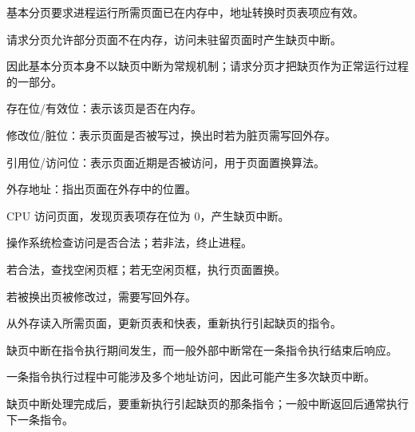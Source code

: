 \begin{points}
  \item 基本分页要求进程运行所需页面已在内存中，地址转换时页表项应有效。
  \item 请求分页允许部分页面不在内存，访问未驻留页面时产生缺页中断。
  \item 因此基本分页本身不以缺页中断为常规机制；请求分页才把缺页作为正常运行过程的一部分。
\end{points}


\begin{points}
  \item 存在位/有效位：表示该页是否在内存。
  \item 修改位/脏位：表示页面是否被写过，换出时若为脏页需写回外存。
  \item 引用位/访问位：表示页面近期是否被访问，用于页面置换算法。
  \item 外存地址：指出页面在外存中的位置。
\end{points}


\begin{points}
  \item CPU 访问页面，发现页表项存在位为 0，产生缺页中断。
  \item 操作系统检查访问是否合法；若非法，终止进程。
  \item 若合法，查找空闲页框；若无空闲页框，执行页面置换。
  \item 若被换出页被修改过，需要写回外存。
  \item 从外存读入所需页面，更新页表和快表，重新执行引起缺页的指令。
\end{points}


\begin{points}
  \item 缺页中断在指令执行期间发生，而一般外部中断常在一条指令执行结束后响应。
  \item 一条指令执行过程中可能涉及多个地址访问，因此可能产生多次缺页中断。
  \item 缺页中断处理完成后，要重新执行引起缺页的那条指令；一般中断返回后通常执行下一条指令。
\end{points}


